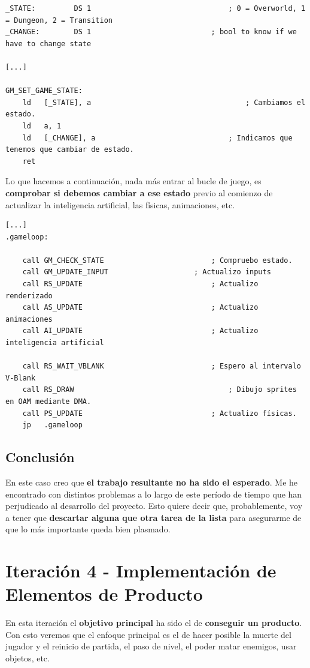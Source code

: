 \begin{lstlisting}[caption={Mapas de Juego}, label={code:gamemaps}]
_STATE: 		DS 1 								; 0 = Overworld, 1 = Dungeon, 2 = Transition
_CHANGE: 		DS 1 							; bool to know if we have to change state

[...]

GM_SET_GAME_STATE:
	ld 	 [_STATE], a 									; Cambiamos el estado.
	ld 	 a, 1
	ld 	 [_CHANGE], a 								; Indicamos que tenemos que cambiar de estado.
	ret
\end{lstlisting}

\clearpage

Lo que hacemos a continuación, nada más entrar al bucle de juego, es \textbf{comprobar si debemos cambiar a ese estado} previo al comienzo de actualizar la inteligencia artificial, las físicas, animaciones, etc.

\begin{lstlisting}[caption={Bucle de Juego}, label={code:gameloop}]
[...]
.gameloop:		

	call GM_CHECK_STATE 						; Compruebo estado.
	call GM_UPDATE_INPUT 					; Actualizo inputs
	call RS_UPDATE 								; Actualizo renderizado
	call AS_UPDATE 								; Actualizo animaciones
	call AI_UPDATE 								; Actualizo inteligencia artificial

	call RS_WAIT_VBLANK 						; Espero al intervalo V-Blank
	call RS_DRAW 									; Dibujo sprites en OAM mediante DMA.
	call PS_UPDATE 								; Actualizo físicas.
	jp   .gameloop
\end{lstlisting}

\subsection{Conclusión}

En este caso creo que \textbf{el trabajo resultante no ha sido el esperado}. Me he encontrado con distintos problemas a lo largo de este período de tiempo que han perjudicado al desarrollo del proyecto. Esto quiere decir que, probablemente, voy a tener que \textbf{descartar alguna que otra tarea de la lista} para asegurarme de que lo más importante queda bien plasmado.

\clearpage

\section{Iteración 4 - Implementación de Elementos de Producto}

En esta iteración el \textbf{objetivo principal} ha sido el de \textbf{conseguir un producto}. Con esto veremos que el enfoque principal es el de hacer posible la muerte del jugador y el reinicio de partida, el paso de nivel, el poder matar enemigos, usar objetos, etc.

